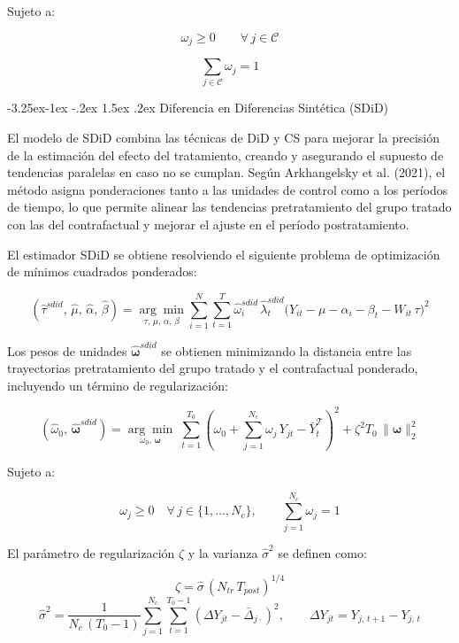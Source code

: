 \documentclass[12pt,a4paper]{article}
\makeatletter
\renewcommand\subsection{\@startsection{subsection}{2}{\z@}%
  {-3.25ex\@plus -1ex \@minus -.2ex}%
  {1.5ex \@plus .2ex}%
  {\normalfont\normalsize}}
\makeatother
\begin{document}
\noindent Sujeto a:

\[
\omega_j \geq 0 \qquad \forall\, j \in \mathcal{C}
\]

\[
\sum_{j \in \mathcal{C}} \omega_j = 1
\]


\subsection{Diferencia en Diferencias Sintética (SDiD)}

El modelo de SDiD combina las técnicas de DiD y CS para mejorar la precisión de la estimación del efecto del tratamiento, creando y asegurando el supuesto de tendencias paralelas en caso no se cumplan. Según Arkhangelsky et al. (2021), el método asigna ponderaciones tanto a las unidades de control como a los períodos de tiempo, lo que permite alinear las tendencias pretratamiento del grupo tratado con las del contrafactual y mejorar el ajuste en el período postratamiento.

El estimador SDiD se obtiene resolviendo el siguiente problema de optimización de mínimos cuadrados ponderados:

\[
(\hat{\tau}^{sdid},\,\hat{\mu},\,\hat{\alpha},\,\hat{\beta}) = \underset{\tau,\,\mu,\,\alpha,\,\beta}{\arg\min} \sum_{i=1}^{N}\sum_{t=1}^{T} \hat{\omega}_i^{sdid}\,\hat{\lambda}_t^{sdid} \bigl(Y_{it} - \mu - \alpha_i - \beta_t - W_{it}\,\tau\bigr)^2
\]

Los pesos de unidades $\hat{\boldsymbol{\omega}}^{sdid}$ se obtienen minimizando la distancia entre las trayectorias pretratamiento del grupo tratado y el contrafactual ponderado, incluyendo un término de regularización:

\[
(\hat{\omega}_0,\,\hat{\boldsymbol{\omega}}^{sdid}) = \underset{\omega_0,\,\boldsymbol{\omega}}{\arg\min}\;\sum_{t=1}^{T_0}\!\left(\omega_0 + \sum_{j=1}^{N_c}\omega_j\,Y_{jt} - \bar{Y}_t^{\mathcal{T}}\right)^{\!2} + \zeta^2 T_0\,\|\boldsymbol{\omega}\|_2^2
\]

\noindent Sujeto a:

\[
\omega_j \geq 0 \quad \forall\, j \in \{1,\ldots,N_c\}, \qquad \sum_{j=1}^{N_c}\omega_j = 1
\]

El parámetro de regularización $\zeta$ y la varianza $\hat{\sigma}^2$ se definen como:

\[
\zeta = \hat{\sigma}\,(N_{tr}\,T_{post})^{1/4}
\]
\[
\hat{\sigma}^2 = \frac{1}{N_c\,(T_0-1)}\sum_{j=1}^{N_c}\sum_{t=1}^{T_0-1}\!\left(\Delta Y_{jt} - \bar{\Delta}_{j\cdot}\right)^2, \qquad \Delta Y_{jt} = Y_{j,\,t+1} - Y_{j,\,t}
\]
\end{document}
